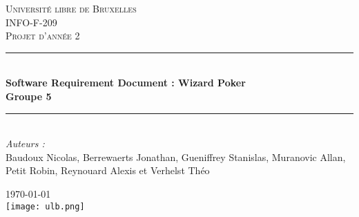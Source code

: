 \documentclass{article}
\begin{document}

\begin{titlepage}

\newcommand{\HRule}{\rule{\linewidth}{0.5mm}} %

\center %


\textsc{\LARGE Université libre de Bruxelles}\\[1.5cm]
\textsc{\Large INFO-F-209}\\[0.5cm]
\textsc{\large Projet d'année 2}\\[0.5cm]


\HRule \\[0.4cm]
{ \huge \bfseries Software Requirement Document : Wizard Poker \\ Groupe 5}\\[0.4cm]
\HRule \\[1.5cm]


\Large \emph{Auteurs :}\\
Baudoux Nicolas, Berrewaerts Jonathan, Gueniffrey Stanislas,  Muranovic Allan, Petit Robin, Reynouard Alexis et Verhelst Théo


{\large \today}\\[2cm]


\texttt{[image: ulb.png]}\\[1cm]


\vfill

\end{titlepage}
\end{document}
